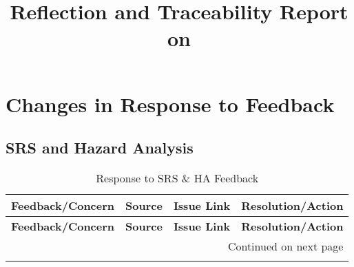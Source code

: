 \documentclass{article}
\title{Reflection and Traceability Report on \progname}
\author{\authname}
\date{}
\begin{document}
\maketitle

\section{Changes in Response to Feedback}

\subsection{SRS and Hazard Analysis}
\begin{longtable}{|p{5cm}|p{1.5cm}|p{2cm}|p{5cm}|}
\caption{Response to SRS \& HA Feedback} \\
\hline
\textbf{Feedback/Concern} & \textbf{Source} & \textbf{Issue Link} & \textbf{Resolution/Action} \\ \hline
\endfirsthead
\hline
\textbf{Feedback/Concern} & \textbf{Source} & \textbf{Issue Link} & \textbf{Resolution/Action} \\ \hline
\endhead
\hline \multicolumn{4}{r}{{Continued on next page}} \\ \hline
\endfoot
\hline
\endlastfoot


\end{longtable}
\end{document}
